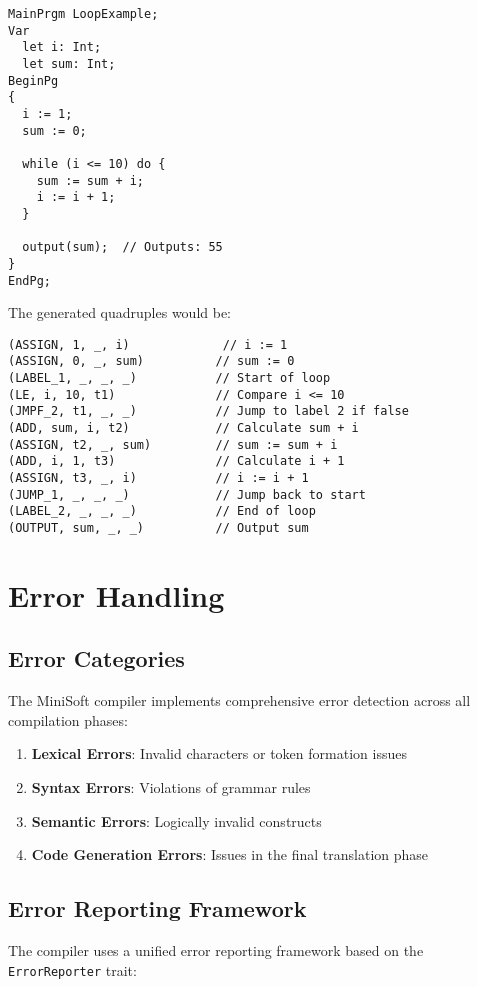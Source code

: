 \documentclass[12pt,a4paper]{article}
\begin{document}
\begin{lstlisting}[caption={Sample MiniSoft Program}]
MainPrgm LoopExample;
Var
  let i: Int;
  let sum: Int;
BeginPg
{
  i := 1;
  sum := 0;
  
  while (i <= 10) do {
    sum := sum + i;
    i := i + 1;
  }
  
  output(sum);  // Outputs: 55
}
EndPg;
\end{lstlisting}

The generated quadruples would be:

\begin{lstlisting}[caption={Generated Quadruples}]
(ASSIGN, 1, _, i)             // i := 1
(ASSIGN, 0, _, sum)          // sum := 0
(LABEL_1, _, _, _)           // Start of loop
(LE, i, 10, t1)              // Compare i <= 10
(JMPF_2, t1, _, _)           // Jump to label 2 if false
(ADD, sum, i, t2)            // Calculate sum + i
(ASSIGN, t2, _, sum)         // sum := sum + i
(ADD, i, 1, t3)              // Calculate i + 1
(ASSIGN, t3, _, i)           // i := i + 1
(JUMP_1, _, _, _)            // Jump back to start
(LABEL_2, _, _, _)           // End of loop
(OUTPUT, sum, _, _)          // Output sum
\end{lstlisting}

\section{Error Handling}
\subsection{Error Categories}
The MiniSoft compiler implements comprehensive error detection across all compilation phases:

\begin{enumerate}
	\item \textbf{Lexical Errors}: Invalid characters or token formation issues
	\item \textbf{Syntax Errors}: Violations of grammar rules
	\item \textbf{Semantic Errors}: Logically invalid constructs
	\item \textbf{Code Generation Errors}: Issues in the final translation phase
\end{enumerate}

\subsection{Error Reporting Framework}
The compiler uses a unified error reporting framework based on the \texttt{ErrorReporter} trait:
\end{document}
